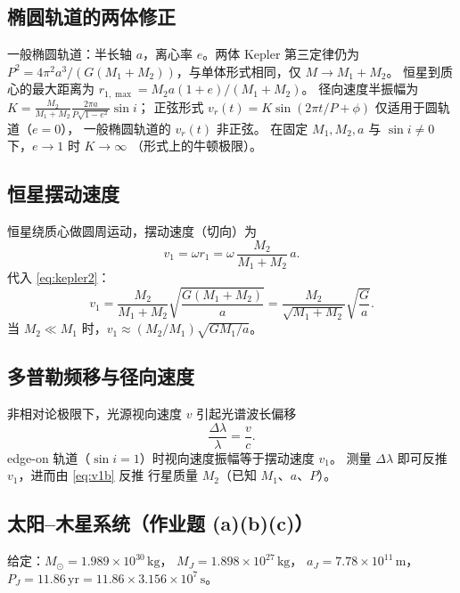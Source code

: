 \documentclass[UTF8,a4paper,11pt]{ctexart}
\begin{document}
\subsection{椭圆轨道的两体修正}
\label{sub:ellipse2}

一般椭圆轨道：半长轴 $a$，离心率 $e$。两体 Kepler 第三定律仍为
$P^2=4\pi^2 a^3/(G(M_1+M_2))$，与单体形式相同，仅 $M\to M_1+M_2$。
恒星到质心的最大距离为 $r_{1,\max}=M_2 a(1+e)/(M_1+M_2)$。
径向速度半振幅为
$K=\frac{M_2}{M_1+M_2}\frac{2\pi a}{P\sqrt{1-e^2}}\sin i$；
正弦形式 $v_r(t)=K\sin(2\pi t/P+\phi)$ 仅适用于圆轨道（$e=0$），
一般椭圆轨道的 $v_r(t)$ 非正弦。
在固定 $M_1,M_2,a$ 与 $\sin i\neq0$ 下，$e\to1$ 时 $K\to\infty$
（形式上的牛顿极限）。

\subsection{恒星摆动速度}
\label{sub:rv}

恒星绕质心做圆周运动，摆动速度（切向）为
\begin{equation}
  v_1=\omega r_1 = \omega\,\frac{M_2}{M_1+M_2}\,a.
  \label{eq:v1}
\end{equation}
代入 \eqref{eq:kepler2}：
\begin{equation}
  v_1 = \frac{M_2}{M_1+M_2}\sqrt{\frac{G(M_1+M_2)}{a}}
  = \frac{M_2}{\sqrt{M_1+M_2}}\sqrt{\frac{G}{a}}.
  \label{eq:v1b}
\end{equation}
当 $M_2\ll M_1$ 时，$v_1\approx (M_2/M_1)\sqrt{GM_1/a}$。

\subsection{多普勒频移与径向速度}
\label{sub:doppler}

非相对论极限下，光源视向速度 $v$ 引起光谱波长偏移
\begin{equation}
  \frac{\Delta\lambda}{\lambda}=\frac{v}{c}.
  \label{eq:doppler}
\end{equation}
edge-on 轨道（$\sin i=1$）时视向速度振幅等于摆动速度 $v_1$。
测量 $\Delta\lambda$ 即可反推 $v_1$，进而由 \eqref{eq:v1b} 反推
行星质量 $M_2$（已知 $M_1$、$a$、$P$）。

\subsection{太阳--木星系统（作业题 (a)(b)(c)）}
\label{sub:jupiter}

给定：$M_\odot=1.989\times10^{30}\,\mathrm{kg}$，
$M_J=1.898\times10^{27}\,\mathrm{kg}$，
$a_J=7.78\times10^{11}\,\mathrm m$，
$P_J=11.86\,\mathrm{yr}=11.86\times3.156\times10^7\,\mathrm s$。
\end{document}
